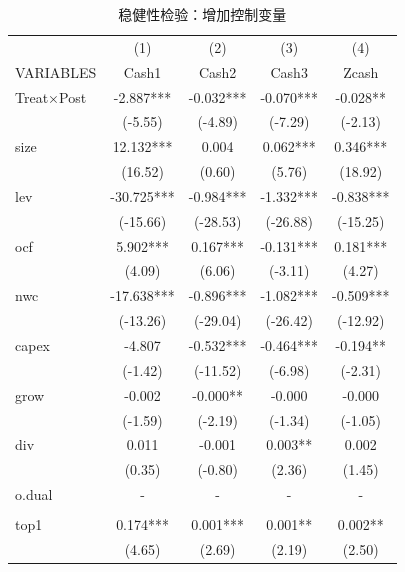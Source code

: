 \documentclass{article}
\begin{document}
\begin{table}[H]
    \centering
    \caption{稳健性检验：增加控制变量}
    \begin{tabular}{lcccc}
    \toprule
                 & (1)         & (2)       & (3)       & (4)       \\ \cmidrule(l){2-5} 
    VARIABLES    & Cash1       & Cash2     & Cash3     & Zcash     \\ \midrule
    Treat×Post   & -2.887***   & -0.032*** & -0.070*** & -0.028**  \\
                 & (-5.55)     & (-4.89)   & (-7.29)   & (-2.13)   \\
    size         & 12.132***   & 0.004     & 0.062***  & 0.346***  \\
                 & (16.52)     & (0.60)    & (5.76)    & (18.92)   \\
    lev          & -30.725***  & -0.984*** & -1.332*** & -0.838*** \\
                 & (-15.66)    & (-28.53)  & (-26.88)  & (-15.25)  \\
    ocf          & 5.902***    & 0.167***  & -0.131*** & 0.181***  \\
                 & (4.09)      & (6.06)    & (-3.11)   & (4.27)    \\
    nwc          & -17.638***  & -0.896*** & -1.082*** & -0.509*** \\
                 & (-13.26)    & (-29.04)  & (-26.42)  & (-12.92)  \\
    capex        & -4.807      & -0.532*** & -0.464*** & -0.194**  \\
                 & (-1.42)     & (-11.52)  & (-6.98)   & (-2.31)   \\
    grow         & -0.002      & -0.000**  & -0.000    & -0.000    \\
                 & (-1.59)     & (-2.19)   & (-1.34)   & (-1.05)   \\
    div          & 0.011       & -0.001    & 0.003**   & 0.002     \\
                 & (0.35)      & (-0.80)   & (2.36)    & (1.45)    \\
    o.dual       & -           & -         & -         & -         \\
                 &             &           &           &           \\
    top1         & 0.174***    & 0.001***  & 0.001**   & 0.002**   \\
                 & (4.65)      & (2.69)    & (2.19)    & (2.50)    \\

\end{tabular}
\end{table}
\end{document}
